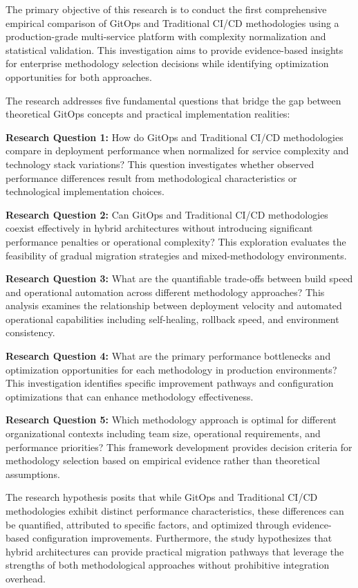 The primary objective of this research is to conduct the first comprehensive empirical comparison of GitOps and Traditional CI/CD methodologies using a production-grade multi-service platform with complexity normalization and statistical validation. This investigation aims to provide evidence-based insights for enterprise methodology selection decisions while identifying optimization opportunities for both approaches.

The research addresses five fundamental questions that bridge the gap between theoretical GitOps concepts and practical implementation realities:

\textbf{Research Question 1:} How do GitOps and Traditional CI/CD methodologies compare in deployment performance when normalized for service complexity and technology stack variations? This question investigates whether observed performance differences result from methodological characteristics or technological implementation choices.

\textbf{Research Question 2:} Can GitOps and Traditional CI/CD methodologies coexist effectively in hybrid architectures without introducing significant performance penalties or operational complexity? This exploration evaluates the feasibility of gradual migration strategies and mixed-methodology environments.

\textbf{Research Question 3:} What are the quantifiable trade-offs between build speed and operational automation across different methodology approaches? This analysis examines the relationship between deployment velocity and automated operational capabilities including self-healing, rollback speed, and environment consistency.

\textbf{Research Question 4:} What are the primary performance bottlenecks and optimization opportunities for each methodology in production environments? This investigation identifies specific improvement pathways and configuration optimizations that can enhance methodology effectiveness.

\textbf{Research Question 5:} Which methodology approach is optimal for different organizational contexts including team size, operational requirements, and performance priorities? This framework development provides decision criteria for methodology selection based on empirical evidence rather than theoretical assumptions.

The research hypothesis posits that while GitOps and Traditional CI/CD methodologies exhibit distinct performance characteristics, these differences can be quantified, attributed to specific factors, and optimized through evidence-based configuration improvements. Furthermore, the study hypothesizes that hybrid architectures can provide practical migration pathways that leverage the strengths of both methodological approaches without prohibitive integration overhead.


